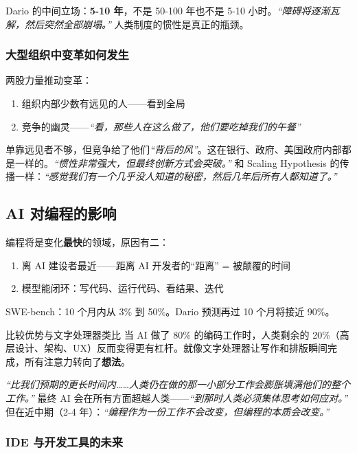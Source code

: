 \documentclass[a4paper]{article}
\begin{document}
Dario 的中间立场：\textbf{5-10 年}，不是 50-100 年也不是 5-10 小时。\textit{``障碍将逐渐瓦解，然后突然全部崩塌。''} 人类制度的惯性是真正的瓶颈。

\subsubsection{大型组织中变革如何发生}

两股力量推动变革：
\begin{enumerate}
    \item 组织内部少数有远见的人——看到全局
    \item 竞争的幽灵——\textit{``看，那些人在这么做了，他们要吃掉我们的午餐''}
\end{enumerate}

单靠远见者不够，但竞争给了他们\textit{``背后的风''}。这在银行、政府、美国政府内部都是一样的。\textit{``惯性非常强大，但最终创新方式会突破。''} 和 Scaling Hypothesis 的传播一样：\textit{``感觉我们有一个几乎没人知道的秘密，然后几年后所有人都知道了。''}

\subsection{AI 对编程的影响}

编程将是变化\textbf{最快}的领域，原因有二：
\begin{enumerate}
    \item 离 AI 建设者最近——距离 AI 开发者的``距离'' = 被颠覆的时间
    \item 模型能闭环：写代码、运行代码、看结果、迭代
\end{enumerate}

SWE-bench：10 个月内从 3\% 到 50\%。Dario 预测再过 10 个月将接近 90\%。

\begin{knowledgebox}{比较优势与文字处理器类比}
当 AI 做了 80\% 的编码工作时，人类剩余的 20\%（高层设计、架构、UX）反而变得更有杠杆。就像文字处理器让写作和排版瞬间完成，所有注意力转向了\textbf{想法}。

\textit{``比我们预期的更长时间内……人类仍在做的那一小部分工作会膨胀填满他们的整个工作。''} 最终 AI 会在所有方面超越人类——\textit{``到那时人类必须集体思考如何应对。''} 但在近中期（2-4 年）：\textit{``编程作为一份工作不会改变，但编程的本质会改变。''}
\end{knowledgebox}

\subsubsection{IDE 与开发工具的未来}
\end{document}

